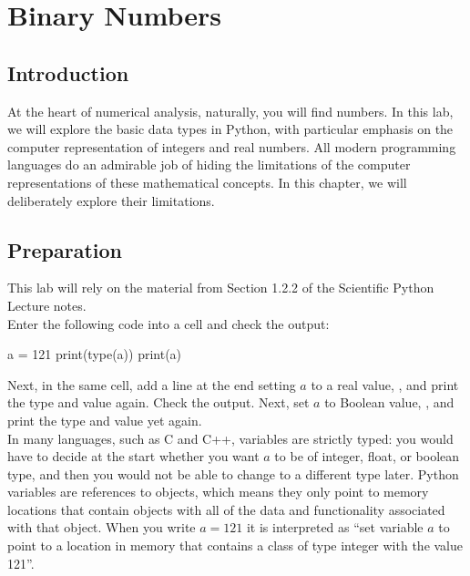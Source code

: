 \chapter{Binary Numbers}

\section{Introduction}

At the heart of numerical analysis, naturally, you will find numbers.
In this lab, we will explore the basic data types in Python, with
particular emphasis on the computer representation of integers and
real numbers.  All modern programming languages do an admirable job of
hiding the limitations of the computer representations of these
mathematical concepts.  In this chapter, we will deliberately explore
their limitations.

\section{Preparation}

This lab will rely on the material from Section 1.2.2 of the
Scientific Python Lecture notes.\\

\plot Enter the following code into a cell and check the output:
\begin{python}
a = 121
print(type(a))
print(a)
\end{python}
Next, in the same cell, add a line at the end setting $a$ to a real value, , and
print the type and value again.  Check the output.  Next, set $a$ to Boolean value,
, and print the type and value yet again. \\

In many languages, such as C and C++, variables are strictly typed:
you would have to decide at the start whether you want $a$ to be of
integer, float, or boolean type, and then you would not be able to
change to a different type later.  Python variables are references to
objects, which means they only point to memory locations that contain
objects with all of the data and functionality associated with that
object.  When you write $a = 121$ it is interpreted as ``set variable
$a$ to point to a location in memory that contains a class of type
integer with the value 121''.\\

